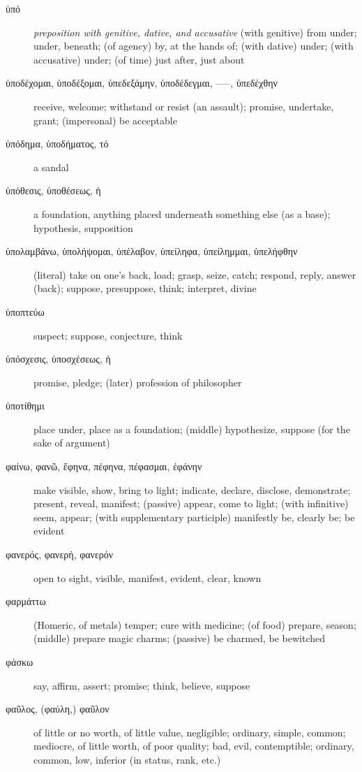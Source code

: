 \documentclass[12pt,letterpaper]{article}
\begin{document}
\begin{description}
    \item[\textgreek{ὑπό}] \marginnote{*}\textit{preposition with genitive, dative, and accusative} (with genitive) from under; under, beneath; (of agency) by, at the hands of; (with dative) under; (with accusative) under; (of time) just after, just about
    \item[\textgreek{ὑποδέχομαι, ὑποδέξομαι, ὑπεδεξάμην, ὑποδέδεγμαι, –––, ὑπεδέχθην}] receive, welcome; withstand or resist (an assault); promise, undertake, grant; (impersonal) be acceptable
    \item[\textgreek{ὑπόδημα, ὑποδήματος, τό}] a sandal
    \item[\textgreek{ὑπόθεσις, ὑποθέσεως, ἡ}] a foundation, anything placed underneath something else (as a base); hypothesis, supposition
    \item[\textgreek{ὑπολαμβάνω, ὑπολήψομαι, ὑπέλαβον, ὑπείληφα, ὑπείλημμαι, ὑπελήφθην}] \marginnote{*}(literal) take on one's back, load; grasp, seize, catch; respond, reply, answer (back); suppose, presuppose, think; interpret, divine
    \item[\textgreek{ὑποπτεύω}] suspect; suppose, conjecture, think
    \item[\textgreek{ὑπόσχεσις, ὑποσχέσεως, ἡ}] promise, pledge; (later) profession of philosopher
    \item[\textgreek{ὑποτίθημι}] place under, place as a foundation; (middle) hypothesize, suppose (for the sake of argument)
    \item[\textgreek{φαίνω, φανῶ, ἔφηνα, πέφηνα, πέφασμαι, ἐφάνην}] \marginnote{*}make visible, show, bring to light; indicate, declare, disclose, demonstrate; present, reveal, manifest; (passive) appear, come to light; (with infinitive) seem, appear; (with supplementary participle) manifestly be, clearly be; be evident
    \item[\textgreek{φανερός, φανερή, φανερόν}] \marginnote{*}open to sight, visible, manifest, evident, clear, known
    \item[\textgreek{φαρμάττω}] (Homeric, of metals) temper; cure with medicine; (of food) prepare, season; (middle) prepare magic charms; (passive) be charmed, be bewitched
    \item[\textgreek{φάσκω}] say, affirm, assert; promise; think, believe, suppose
    \item[\textgreek{φαῦλος, (φαύλη,) φαῦλον}] of little or no worth, of little value, negligible; ordinary, simple, common; mediocre, of little worth, of poor quality; bad, evil, contemptible; ordinary, common, low, inferior (in status, rank, etc.)

\end{description}
\end{document}
